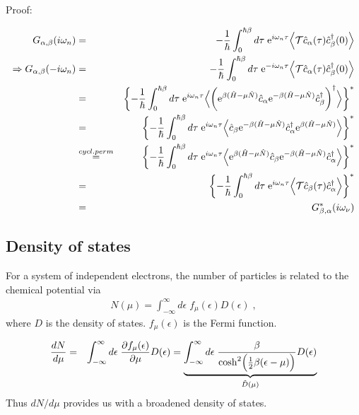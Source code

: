 \documentclass[11pt,a4paper]{report}
\begin{document}
Proof:

\begin{eqnarray}
G_{\alpha,\beta}(i\omega_n)&=&
-\frac{1}{\hbar}\int_0^{\hbar\beta} d\tau\;\mathrm{e}^{i\omega_n\tau}
\Bigl\langle\mathcal{T}\hat{c}_\alpha(\tau)\hat{c}^\dagger_\beta(0)\Bigr\rangle
\\
\Rightarrow
G_{\alpha,\beta}(-i\omega_n)
&=&
-\frac{1}{\hbar}\int_0^{\hbar\beta} d\tau\;\mathrm{e}^{-i\omega_n\tau}
\Bigl\langle\mathcal{T}\hat{c}_\alpha(\tau)\hat{c}^\dagger_\beta(0)\Bigr\rangle
\nonumber\\
&=&
\biggl\lbrace
-\frac{1}{\hbar}\int_0^{\hbar\beta} d\tau\;\mathrm{e}^{i\omega_n\tau}
\Bigl\langle\biggl(\mathrm{e}^{\beta(\hat{H}-\mu\hat{N})}\hat{c}_\alpha
\mathrm{e}^{-\beta(\hat{H}-\mu\hat{N})}\hat{c}^\dagger_\beta\biggr)^\dagger
\Bigr\rangle
\biggr\rbrace^*
\nonumber\\
&=&
\biggl\lbrace
-\frac{1}{\hbar}\int_0^{\hbar\beta} d\tau\;\mathrm{e}^{i\omega_n\tau}
\Bigl\langle
\hat{c}_\beta\mathrm{e}^{-\beta(\hat{H}-\mu\hat{N})}\hat{c}^\dagger_\alpha
\mathrm{e}^{\beta(\hat{H}-\mu\hat{N})}
\Bigr\rangle
\biggr\rbrace^*
\nonumber\\
&\stackrel{cycl. perm}{=}&
\biggl\lbrace
-\frac{1}{\hbar}\int_0^{\hbar\beta} d\tau\;\mathrm{e}^{i\omega_n\tau}
\Bigl\langle
\mathrm{e}^{\beta(\hat{H}-\mu\hat{N})}
\hat{c}_\beta\mathrm{e}^{-\beta(\hat{H}-\mu\hat{N})}\hat{c}^\dagger_\alpha
\Bigr\rangle
\biggr\rbrace^*
\nonumber\\
&=&
\biggl\lbrace
-\frac{1}{\hbar}\int_0^{\hbar\beta} d\tau\;\mathrm{e}^{i\omega_n\tau}
\Bigl\langle
\mathcal{T}\hat{c}_\beta(\tau)\hat{c}^\dagger_\alpha
\Bigr\rangle
\biggr\rbrace^*
\nonumber\\
&=&
G_{\beta,\alpha}^*(i\omega_\nu)
\end{eqnarray}

\subsection{Density of states}
For a system of independent electrons, the number of particles is
related to the chemical potential via
\begin{eqnarray}
N(\mu)=\int_{-\infty}^\infty d\epsilon\; f_\mu(\epsilon) D(\epsilon)
\;,
\end{eqnarray}
where $D$ is the density of states. $f_\mu(\epsilon)$ is the Fermi function.

\begin{eqnarray}
\frac{dN}{d\mu}
&=&\int_{-\infty}^\infty d\epsilon\; 
\frac{\partial f_\mu(\epsilon)}{\partial\mu} D(\epsilon)
=
\underbrace{\int_{-\infty}^\infty d\epsilon\; 
\frac{\beta}{\cosh^2\Bigl(\frac{1}{2}\beta(\epsilon-\mu)\Bigr)} D(\epsilon)
}_{\tilde{D}(\mu)}
\end{eqnarray}
Thus $dN/d\mu$ provides us with a broadened density of states.
\end{document}

